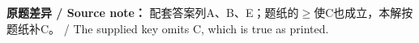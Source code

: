 \textbf{原题差异 / Source note：} 配套答案列A、B、E；题纸的\ensuremath{\ge}使C也成立，本解按题纸补C。 / The supplied key omits C, which is true as printed.
